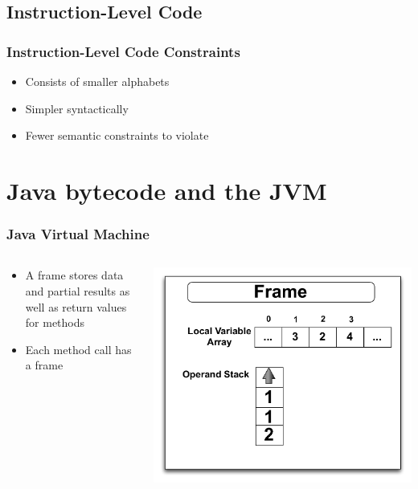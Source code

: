 \documentclass{beamer}
\begin{document}
\subsection{Instruction-Level Code}
\begin{frame}
	\frametitle{Instruction-Level Code Constraints}
	\begin{itemize}
		\item Consists of smaller alphabets
		\item Simpler syntactically
		\item Fewer semantic constraints to violate
	\end{itemize}		
\end{frame}




\section[Bytecode and Assembly]{Java bytecode and the JVM}

\begin{frame}
	\frametitle{Java Virtual Machine}
\begin{columns}
\begin{column}{0.5\textwidth}
\begin{itemize}	
\item A frame stores data and partial results as well as return values for methods
\item Each method call has a frame

\end{itemize}
\end{column}
\begin{column}{0.5\textwidth}
\includegraphics[width=1\textwidth]{Illustrations/frame.pdf}
\end{column}
\end{columns}



\end{frame}
\end{document}
